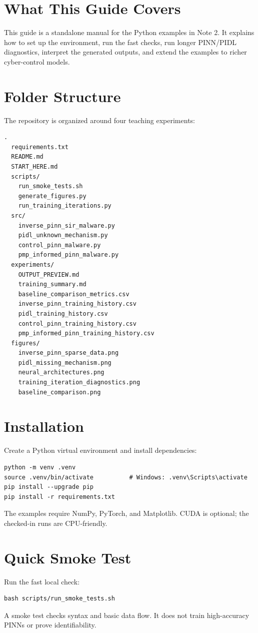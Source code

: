 \documentclass[11pt,a4paper]{article}
\begin{document}
\tableofcontents
\newpage
{}

\section{What This Guide Covers}
This guide is a standalone manual for the Python examples in Note 2. It explains how to set up the environment, run the fast checks, run longer PINN/PIDL diagnostics, interpret the generated outputs, and extend the examples to richer cyber-control models.

\section{Folder Structure}
The repository is organized around four teaching experiments:
\begin{verbatim}
.
  requirements.txt
  README.md
  START_HERE.md
  scripts/
    run_smoke_tests.sh
    generate_figures.py
    run_training_iterations.py
  src/
    inverse_pinn_sir_malware.py
    pidl_unknown_mechanism.py
    control_pinn_malware.py
    pmp_informed_pinn_malware.py
  experiments/
    OUTPUT_PREVIEW.md
    training_summary.md
    baseline_comparison_metrics.csv
    inverse_pinn_training_history.csv
    pidl_training_history.csv
    control_pinn_training_history.csv
    pmp_informed_pinn_training_history.csv
  figures/
    inverse_pinn_sparse_data.png
    pidl_missing_mechanism.png
    neural_architectures.png
    training_iteration_diagnostics.png
    baseline_comparison.png
\end{verbatim}

\section{Installation}
Create a Python virtual environment and install dependencies:
\begin{lstlisting}[style=pythonstyle]
python -m venv .venv
source .venv/bin/activate          # Windows: .venv\Scripts\activate
pip install --upgrade pip
pip install -r requirements.txt
\end{lstlisting}
The examples require NumPy, PyTorch, and Matplotlib. CUDA is optional; the checked-in runs are CPU-friendly.

\section{Quick Smoke Test}
Run the fast local check:
\begin{lstlisting}[style=pythonstyle]
bash scripts/run_smoke_tests.sh
\end{lstlisting}
A smoke test checks syntax and basic data flow. It does not train high-accuracy PINNs or prove identifiability.
\end{document}
